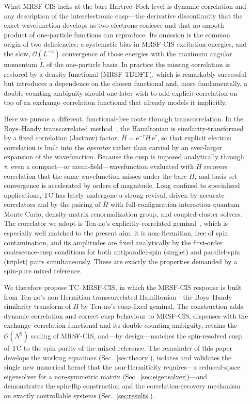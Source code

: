 \documentclass[aps,prb,reprint,superscriptaddress,floatfix]{revtex4-2}
\newcommand{\Hbar}{\bar{H}}
\newcommand{\ee}{\mathrm{e}}
\begin{document}
What MRSF-CIS lacks at the bare Hartree--Fock level is dynamic correlation and any
description of the interelectronic cusp---the derivative discontinuity that the
exact wavefunction develops as two electrons coalesce and that no smooth product
of one-particle functions can reproduce. Its omission is the common origin of two
deficiencies: a systematic bias in MRSF-CIS excitation energies, and the slow,
$\mathcal{O}(L^{-3})$ convergence of those energies with the maximum angular
momentum $L$ of the one-particle basis. In practice the missing correlation is
restored by a density functional (MRSF-TDDFT), which is remarkably successful but
introduces a dependence on the chosen functional and, more fundamentally, a
double-counting ambiguity should one later wish to add explicit correlation on top
of an exchange--correlation functional that already models it implicitly.

Here we pursue a different, functional-free route through transcorrelation. In the
Boys--Handy transcorrelated method~\cite{boys1969}, the Hamiltonian is
similarity-transformed by a fixed correlation (Jastrow) factor,
$\Hbar=\ee^{-\tau}H\,\ee^{\tau}$, so that explicit electron correlation is built
into the \emph{operator} rather than carried by an ever-larger expansion of the
wavefunction. Because the cusp is imposed analytically through $\tau$, even a
compact---or mean-field---wavefunction evaluated with $\Hbar$ recovers correlation
that the same wavefunction misses under the bare $H$, and basis-set convergence is
accelerated by orders of magnitude. Long confined to specialized applications, TC
has lately undergone a strong revival, driven by accurate correlators and by the
pairing of $\Hbar$ with full-configuration-interaction quantum Monte Carlo,
density-matrix renormalization group, and coupled-cluster solvers. The
correlator we adopt is Ten-no's explicitly-correlated geminal~\cite{tenno2000,tenno2023},
which is especially well matched to the present aim: it is non-Hermitian, free of
spin contamination, and its amplitudes are fixed analytically by the first-order
coalescence-cusp conditions for both antiparallel-spin (singlet) and
parallel-spin (triplet) pairs simultaneously. These are exactly the properties
demanded by a spin-pure mixed reference.

We therefore propose TC--MRSF-CIS, in which the MRSF-CIS response is built from
Ten-no's non-Hermitian transcorrelated Hamiltonian---the Boys--Handy similarity
transform of $H$ by Ten-no's cusp-fixed geminal. The construction adds
dynamic correlation and correct cusp behaviour to MRSF-CIS, dispenses with the
exchange--correlation functional and its double-counting ambiguity, retains the
$\mathcal{O}(N^5)$ scaling of MRSF-CIS, and---by design---matches the
spin-resolved cusp of TC to the spin purity of the mixed reference. The remainder
of this paper develops the working equations (Sec.~\ref{sec:theory}), isolates and
validates the single new numerical kernel that the non-Hermiticity requires---a
reduced-space eigensolver for a non-symmetric matrix
(Sec.~\ref{sec:eigensolver})---and demonstrates the spin-flip construction and the
correlation-recovery mechanism on exactly controllable systems
(Sec.~\ref{sec:results}).
\end{document}
